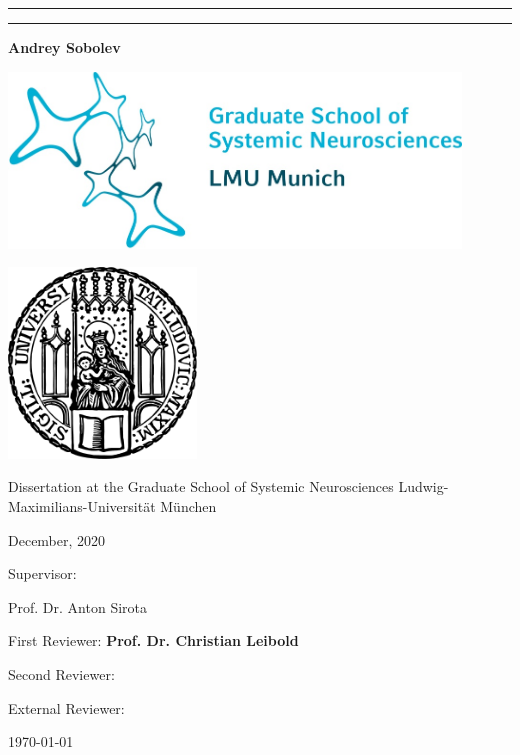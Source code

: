 \begin{titlepage}
	\centering

  \noindent\rule{15cm}{0.4pt}
  {\linespread{1.5}{\Huge Contribution of the idiothetic and the allothetic information to the hippocampal place code\par}}
  \noindent\rule{15cm}{0.4pt}

  {\LARGE \bfseries Andrey Sobolev}

  \includegraphics[width=120mm]{assets/gsn.jpg}

  \includegraphics[width=50mm]{assets/lmu-logo.png}

  Dissertation at the
  Graduate School of Systemic Neurosciences
	Ludwig-Maximilians-Universität München

  December, 2020

  \vfill

	\begin{flushleft}
	{\large Supervisor:}

	{\LARGE Prof. Dr. Anton Sirota\par}

	\vspace{1in}

	{\large First Reviewer:   \bfseries Prof. Dr. Christian Leibold\par}
	{\large Second Reviewer:\par}
	{\large External Reviewer:\par}

  \vspace{1in}

	{\large \today\par}
	\end{flushleft}

\end{titlepage}
